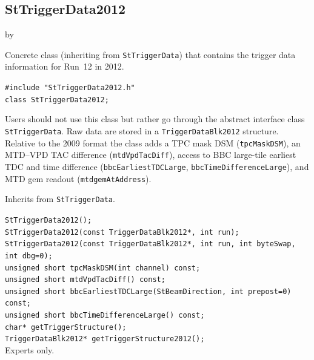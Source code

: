 \documentclass[twoside]{article}
\newcommand{\entrylabel}[1]{\mbox{\textbf{{#1}}}\hfil}%
\newenvironment{entry}
{\begin{list}{}%
    {\renewcommand{\makelabel}{\entrylabel}%
     \setlength{\labelwidth}{90pt}%
     \setlength{\leftmargin}{\labelwidth}
     \advance\leftmargin by \labelsep%
      }%
    }%
  {\end{list}}
\newcommand{\Entrylabel}[1]%
{\raisebox{0pt}[1ex][0pt]{\makebox[\labelwidth][l]%
    {\parbox[t]{\labelwidth}{\hspace{0pt}\textbf{{#1}}}}}}
\newenvironment{Entry}%
{\renewcommand{\entrylabel}{\Entrylabel}\begin{entry}}%
  {\end{entry}}
\begin{document}
\subsection{StTriggerData2012}
\label{sec:StTriggerData2012}
\begin{Entry}
\item[Summary] Concrete class (inheriting from \texttt{StTriggerData}) that
    contains the trigger data information for Run~12 in 2012.
\item[Synopsis]
    \verb+#include "StTriggerData2012.h"+\\
    \verb+class StTriggerData2012;+\\
\item[Description] Users should not use this class but rather go through the
    abstract interface class \texttt{StTriggerData}.  Raw data are stored in a
    \verb+TriggerDataBlk2012+ structure.  Relative to the 2009 format the class
    adds a TPC mask DSM (\verb+tpcMaskDSM+), an MTD--VPD TAC difference
    (\verb+mtdVpdTacDiff+), access to BBC large-tile earliest TDC and time
    difference (\verb+bbcEarliestTDCLarge+, \verb+bbcTimeDifferenceLarge+), and
    MTD gem readout (\verb+mtdgemAtAddress+).
\item[Related Classes] Inherits from \texttt{StTriggerData}.
\item[Public\\ Constructors]
    \verb+StTriggerData2012();+\\
    \verb+StTriggerData2012(const TriggerDataBlk2012*, int run);+\\
    \verb+StTriggerData2012(const TriggerDataBlk2012*, int run, int byteSwap, int dbg=0);+\\
    \verb+unsigned short tpcMaskDSM(int channel) const;+\\
    \verb+unsigned short mtdVpdTacDiff() const;+\\
    \verb+unsigned short bbcEarliestTDCLarge(StBeamDirection, int prepost=0) const;+\\
    \verb+unsigned short bbcTimeDifferenceLarge() const;+\\
    \verb+char* getTriggerStructure();+\\
    \verb+TriggerDataBlk2012* getTriggerStructure2012();+\\
    Experts only.
\end{Entry}
\clearpage
\end{document}
